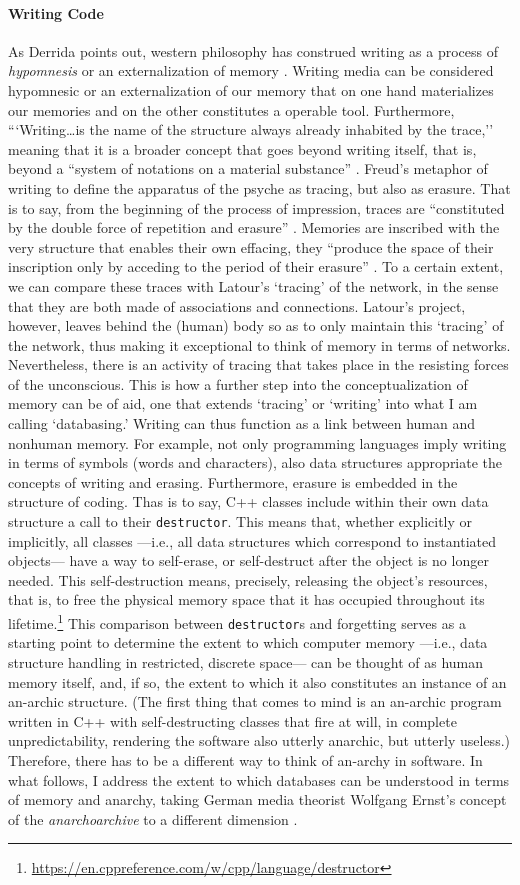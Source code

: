 \paragraph{Writing Code}
As Derrida points out, western philosophy has construed writing as a process of \textit{hypomnesis} or an externalization of memory \parencite[221]{Der78:Wri}. Writing media can be considered hypomnesic or an externalization of our memory that on one hand materializes our memories and on the other constitutes a operable tool. Furthermore, ```Writing\dots is the name of the structure always already inhabited by the trace,'' meaning that it is a broader concept that goes beyond writing itself, that is, beyond a ``system of notations on a material sub­stance'' \parencite[xxxix]{Der76:Of}. Freud's metaphor of writing to define the apparatus of the psyche as tracing, but also as erasure. That is to say, from the beginning of the process of impression, traces are ``constituted by the double force of repetition and erasure'' \parencite[226]{Der78:Wri}. Memories are inscribed with the very structure that enables their own effacing, they ``produce the space of their inscription only by acceding to the period of their erasure'' \parencite[226]{Der78:Wri}. To a certain extent, we can compare these traces with Latour's `tracing' of the network, in the sense that they are both made of associations and connections. Latour's project, however, leaves behind the (human) body so as to only maintain this `tracing' of the network, thus making it exceptional to think of memory in terms of networks. Nevertheless, there is an activity of tracing that takes place in the resisting forces of the unconscious. This is how a further step into the conceptualization of memory can be of aid, one that extends `tracing' or `writing' into what I am calling `databasing.' Writing can thus function as a link between human and nonhuman memory. For example, not only programming languages imply writing in terms of symbols (words and characters), also data structures appropriate the concepts of writing and erasing. Furthermore, erasure is embedded in the structure of coding. Thas is to say, C++ classes include within their own data structure a call to their \texttt{destructor}. This means that, whether explicitly or implicitly, all classes ---i.e., all data structures which correspond to instantiated objects--- have a way to self-erase, or self-destruct after the object is no longer needed. This self-destruction means, precisely, releasing the object's resources, that is, to free the physical memory space that it has occupied throughout its lifetime.\footnote{\url{https://en.cppreference.com/w/cpp/language/destructor}} This comparison between \texttt{destructor}s and forgetting serves as a starting point to determine the extent to which computer memory ---i.e., data structure handling in restricted, discrete space--- can be thought of as human memory itself, and, if so, the extent to which it also constitutes an instance of an an-archic structure. (The first thing that comes to mind is an an-archic program written in C++ with self-destructing classes that fire at will, in complete unpredictability, rendering the software also utterly anarchic, but utterly useless.) Therefore, there has to be a different way to think of an-archy in software. In what follows, I address the extent to which databases can be understood in terms of memory and anarchy, taking German media theorist Wolfgang Ernst's concept of the \textit{anarchoarchive} to a different dimension . 

